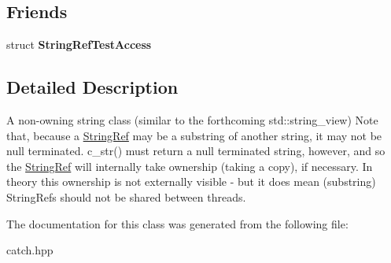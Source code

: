 \subsection*{Friends}
\begin{DoxyCompactItemize}
\item 
\mbox{\label{class_catch_1_1_string_ref_a420e64e1652de1b0d427775781b018f5}} 
struct {\bfseries String\+Ref\+Test\+Access}
\end{DoxyCompactItemize}


\subsection{Detailed Description}
A non-\/owning string class (similar to the forthcoming std\+::string\+\_\+view) Note that, because a \mbox{\hyperlink{class_catch_1_1_string_ref}{String\+Ref}} may be a substring of another string, it may not be null terminated. c\+\_\+str() must return a null terminated string, however, and so the \mbox{\hyperlink{class_catch_1_1_string_ref}{String\+Ref}} will internally take ownership (taking a copy), if necessary. In theory this ownership is not externally visible -\/ but it does mean (substring) String\+Refs should not be shared between threads. 

The documentation for this class was generated from the following file\+:\begin{DoxyCompactItemize}
\item 
catch.\+hpp\end{DoxyCompactItemize}
